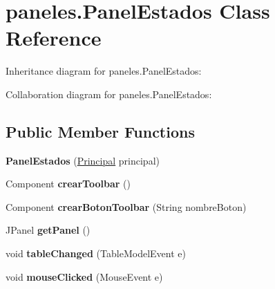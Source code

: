 \hypertarget{classpaneles_1_1_panel_estados}{}\section{paneles.\+Panel\+Estados Class Reference}
\label{classpaneles_1_1_panel_estados}


Inheritance diagram for paneles.\+Panel\+Estados\+:


Collaboration diagram for paneles.\+Panel\+Estados\+:
\subsection*{Public Member Functions}
\begin{DoxyCompactItemize}
\item 
\mbox{\label{classpaneles_1_1_panel_estados_a58b73ebb992e4dd681a60d7d1d8497c2}} 
{\bfseries Panel\+Estados} (\mbox{\hyperlink{classvistas_1_1_principal}{Principal}} principal)
\item 
\mbox{\label{classpaneles_1_1_panel_estados_ae62e5c6656177ec67c97cc2fe48d1e54}} 
Component {\bfseries crear\+Toolbar} ()
\item 
\mbox{\label{classpaneles_1_1_panel_estados_af627b3edddac65046fd93dc774904597}} 
Component {\bfseries crear\+Boton\+Toolbar} (String nombre\+Boton)
\item 
\mbox{\label{classpaneles_1_1_panel_estados_a8f949a32d4a35371a2f2b37a66ede21c}} 
J\+Panel {\bfseries get\+Panel} ()
\item 
\mbox{\label{classpaneles_1_1_panel_estados_a317a78c32717a2c06cbb82f990e411ff}} 
void {\bfseries table\+Changed} (Table\+Model\+Event e)
\item 
\mbox{\label{classpaneles_1_1_panel_estados_a2042bfd835f4ceea6a1e055cc388add5}} 
void {\bfseries mouse\+Clicked} (Mouse\+Event e)
\item 
\mbox{\label{classpaneles_1_1_panel_estados_a4bb90c78460058ff38dd8d70d4bc4db8}} 

\end{DoxyCompactItemize}
